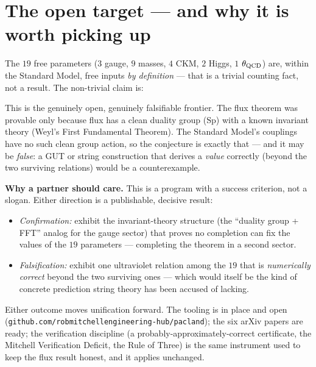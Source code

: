 \documentclass[11pt]{article}
\begin{document}
\section{The open target --- and why it is worth picking up}

The $19$ free parameters ($3$ gauge, $9$ masses, $4$ CKM, $2$ Higgs, $1$ $\theta_{\rm
QCD}$) are, within the Standard Model, free inputs \emph{by definition} --- that is a
trivial counting fact, not a result. The non-trivial claim is:

\begin{center}
\end{center}

This is the genuinely open, genuinely falsifiable frontier. The flux theorem was
provable only because flux has a clean duality group ($\mathrm{Sp}$) with a known
invariant theory (Weyl's First Fundamental Theorem). The Standard Model's couplings have
no such clean group action, so the conjecture is exactly that --- and it may be
\emph{false}: a GUT or string construction that derives a \emph{value} correctly (beyond
the two surviving relations) would be a counterexample.

\textbf{Why a partner should care.} This is a program with a success criterion, not a
slogan. Either direction is a publishable, decisive result:
\begin{itemize}
\item \emph{Confirmation:} exhibit the invariant-theory structure (the ``duality group +
FFT'' analog for the gauge sector) that proves no completion can fix the values of the
$19$ parameters --- completing the theorem in a second sector.
\item \emph{Falsification:} exhibit one ultraviolet relation among the $19$ that is
\emph{numerically correct} beyond the two surviving ones --- which would itself be the
kind of concrete prediction string theory has been accused of lacking.
\end{itemize}
Either outcome moves unification forward. The tooling is in place and open
(\texttt{github.com/robmitchellengineering-hub/pacland}); the six arXiv papers are
ready; the verification discipline (a probably-approximately-correct certificate, the
Mitchell Verification Deficit, the Rule of Three) is the same instrument used to keep
the flux result honest, and it applies unchanged.
\end{document}
